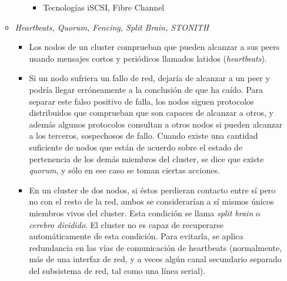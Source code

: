 \begin{itemize}
\begin{itemize}
\begin{itemize}
\begin{itemize}
				\item Tecnologías iSCSI, Fibre Channel
			\end{itemize}
		\end{itemize}
		\item \textit{Heartbeats, Quorum, Fencing, Split Brain, STONITH}
		\begin{itemize}
			\item Los nodos de un cluster comprueban que pueden alcanzar a sus peers usando mensajes cortos y periódicos llamados latidos (\textit{heartbeats}).
			\item Si un nodo sufriera un fallo de red, dejaría de alcanzar a un peer y podría llegar erróneamente a la conclusión de que ha caído. Para separar este falso positivo de falla, los nodos siguen protocolos distribuidos que comprueban que son capaces de alcanzar a otros, y además algunos protocolos consultan a otros nodos si pueden alcanzar a los terceros, sospechosos de fallo. Cuando existe una cantidad suficiente de nodos que están de acuerdo sobre el estado de pertenencia de los demás miembros del cluster, se dice que existe \textit{quorum}, y sólo en ese caso se toman ciertas acciones.
			\item En un cluster de dos nodos, si éstos perdieran contacto entre sí pero no con el resto de la red, ambos se considerarían a sí mismos únicos miembros vivos del cluster. Esta condición se llama \textit{split brain} o \textit{cerebro dividido}. El cluster no es capaz de recuperarse automáticamente de esta condición. Para evitarla, se aplica redundancia en las vías de comunicación de heartbeats (normalmente, más de una interfaz de red, y a veces algún canal secundario separado del subsistema de red, tal como una línea serial).


\end{itemize}
\end{itemize}
\end{itemize}
